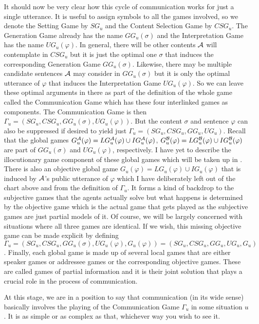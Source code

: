 It should now be very clear how this cycle of communication works for just a single utterance. It is useful to assign symbols to all the games involved, so we denote the Setting Game by $SG_u$ and the Content Selection Game by $CSG_u$. The Generation Game already has the name $GG_u(\sigma)$ and the Interpretation Game has the name $UG_u(\varphi)$. In general, there will be other contents $\cal A$ will contemplate in $CSG_u$ but it is just the optimal one $\sigma$ that induces the corresponding Generation Game $GG_u(\sigma)$. Likewise, there may be multiple candidate sentences $\cal A$ may consider in $GG_u(\sigma)$ but it is only the optimal utterance of $\varphi$ that induces the Interpretation Game $UG_u(\varphi)$. So we can leave these optimal arguments in there as part of the definition of the whole game called the Communication Game which has these four interlinked games as components. The Communication Game is then $\Gamma_u = (SG_u, CSG_u, GG_u(\sigma), UG_u(\varphi))$. But the content $\sigma$ and sentence $\varphi$ can also be suppressed if desired to yield just $\Gamma_u = (SG_u, CSG_u, GG_u, UG_u)$. Recall that the global games $G^{\cal A}_u(\varphi) = LG^{\cal A}_u(\varphi) \cup IG^{\cal A}_u(\varphi)$, $G^{\cal B}_u(\varphi) = LG^{\cal B}_u(\varphi) \cup IG^{\cal B}_u(\varphi)$ are part of $GG_u(\sigma)$ and $UG_u(\varphi)$, respectively. I have yet to describe the illocutionary game component of these global games which will be taken up in . There is also an objective global game $G_u(\varphi) = LG_u(\varphi) \cup IG_u(\varphi)$ that is induced by $\cal A$'s public utterance of $\varphi$ which I have deliberately left out of the chart above and from the definition of $\Gamma_u$. It forms a kind of backdrop to the subjective games that the agents actually solve but what happens is determined by the objective game which is the actual game that gets played as the subjective games are just partial models of it. Of course, we will be largely concerned with situations where all three games are identical. If we wish, this missing objective game can be made explicit by defining $\Gamma_u = (SG_u, CSG_u, GG_u(\sigma), UG_u(\varphi), G_u(\varphi)) = (SG_u, CSG_u, GG_u, UG_u, G_u)$. Finally, each global game is made up of several local games that are either speaker games or addressee games or the corresponding objective games. These are called games of partial information and it is their joint solution that plays a crucial role in the process of communication.

At this stage, we are in a position to say that communication (in its wide sense) basically involves the playing of the Communication Game $\Gamma_u$ in some situation $u$. It is as simple or as complex as that, whichever way you wish to see it.
